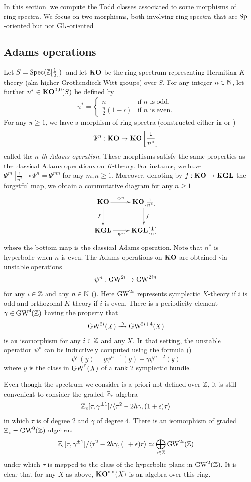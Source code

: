 In this section, we compute the Todd classes associated to some morphisms of ring spectra. We focus on two morphisms, both involving ring spectra that are $\mathrm{Sp}$-oriented but not $\mathrm{GL}$-oriented.   

\subsection{Adams operations}

Let $S=\operatorname{Spec} (\mathbb{Z}[\frac 12])$, and let $\mathbf{KO}$ be the ring spectrum representing Hermitian $K$-theory (aka higher Grothendieck-Witt groups) over $S$. For any integer $n\in \mathbb{N}$, let further $n^*\in \mathbf{KO}^{0,0}(S)$ be defined by 
\[
n^*=\begin{cases} n & \text{if $n$ is odd.} \\ \frac n2(1-\epsilon) & \text{if $n$ is even.}\end{cases}
\]
For any $n\geq 1$, we have a morphism of ring spectra (constructed either in \cite{FH21} or \cite{Bachmann20a})
\[
\Psi^n:\mathbf{KO}\to \mathbf{KO}\left[\frac 1{n^*}\right]
\]
called the \emph{$n$-th Adams operation}. These morphisms satisfy the same properties as the classical Adams operations on $K$-theory. For instance, we have $\Psi^m[\frac 1{n^*}]\circ\Psi^n=\Psi^{mn}$ for any $m,n\geq 1$. Moreover, denoting by $f:\mathbf{KO}\to \mathbf{KGL}$ the forgetful map, we obtain a commutative diagram for any $n\geq 1$
\[
\xymatrix{\KO\ar[r]^-{\Psi^n}\ar[d]_-f & \KO[\frac 1{n^*}]\ar[d]^-f \\
\KGL\ar[r]_-{\Psi^n} &  \KGL[\frac 1{n}]}
\]
where the bottom map is the classical Adams operation. Note that $n^*$ is hyperbolic when $n$ is even. The Adams operations on $\mathbf{KO}$ are obtained via unstable operations
\[
\psi^n:\operatorname{GW}^{2i}\to \operatorname{GW}^{2in}
\]
for any $i\in\mathbb{Z}$ and any $n\in\mathbb{N}$ (\cite[\S 5]{FH21}). Here $\operatorname{GW}^{2i}$ represents symplectic $K$-theory if $i$ is odd and orthogonal $K$-theory if $i$ is even. There is a periodicity element $\gamma\in \operatorname{GW}^{4}(\mathbb{Z})$ having the property that  
\[
\operatorname{GW}^{2i}(X)\xrightarrow{\cdot\gamma} \operatorname{GW}^{2i+4}(X)
\]
is an isomorphism for any $i\in \mathbb{Z}$ and any $X$. In that setting, the unstable operation $\psi^n$ can be inductively computed using the formula  (\cite[(5.1.c)]{FH21})
\begin{equation}\label{eqn:inductiveAdams}
\psi^n(y)=y\psi^{n-1}(y)-\gamma\psi^{n-2}(y)
\end{equation}
where $y$ is the class in $\operatorname{GW}^{2}(X)$ of a rank $2$ symplectic bundle.


Even though the spectrum we consider is a priori not defined over $\mathbb{Z}$, it is still convenient to consider the graded $\mathbb{Z}_{\epsilon}$-algebra
\[
\mathbb{Z}_{\epsilon}[\tau,\gamma^{\pm 1}]/\langle \tau^2-2h\gamma,(1+\epsilon)\tau\rangle
\]
in which $\tau$ is of degree $2$ and $\gamma$ of degree $4$. There is an isomorphism of graded $\mathbb{Z}_{\epsilon}=\operatorname{GW}^0(\mathbb{Z})$-algebras
\[
\mathbb{Z}_{\epsilon}[\tau,\gamma^{\pm 1}]/\langle \tau^2-2h\gamma,(1+\epsilon)\tau\rangle\simeq \bigoplus_{i\in\mathbb{Z}}\operatorname{GW}^{2i}(\mathbb{Z})
\]
under which $\tau$ is mapped to the class of the hyperbolic plane in $\operatorname{GW}^2(\mathbb{Z})$. It is clear that for any $X$ as above, $\mathbf{KO}^{*,*}(X)$ is an algebra over this ring.

